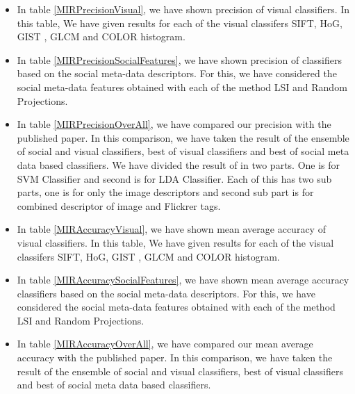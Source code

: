 \begin{itemize}
\item In table \ref{MIRPrecisionVisual}, we have shown precision of visual classifiers. In this table, We have given results for each of the visual classifers SIFT, HoG, GIST , GLCM and COLOR histogram.
\item In table \ref{MIRPrecisionSocialFeatures}, we have shown precision of classifiers based on the social meta-data descriptors. For this, we have considered the social meta-data features obtained with each of the method LSI and Random Projections.
\item In table \ref{MIRPrecisionOverAll}, we have compared our precision with the published paper. In this comparison, we have taken the result of the ensemble of social and visual classifiers,  best of visual classifiers and best of social meta data based classifiers. We have divided the result of \citep{MIRresults} in two parts. One is for SVM Classifier and second is for LDA Classifier. Each of this has two sub parts, one is for only the image descriptors and second sub part is for combined descriptor of image and Flickrer tags.
\item In table \ref{MIRAccuracyVisual}, we have shown mean average accuracy of visual classifiers. In this table, We have given results for each of the visual classifers SIFT, HoG, GIST , GLCM and COLOR histogram.
\item In table \ref{MIRAccuracySocialFeatures}, we have shown mean average accuracy classifiers based on the social meta-data descriptors. For this, we have considered the social meta-data features obtained with each of the method LSI and Random Projections.
\item In table \ref{MIRAccuracyOverAll}, we have compared our mean average accuracy with the published paper. In this comparison, we have taken the result of the ensemble of social and visual classifiers,  best of visual classifiers and best of social meta data based classifiers. 
\end{itemize}

